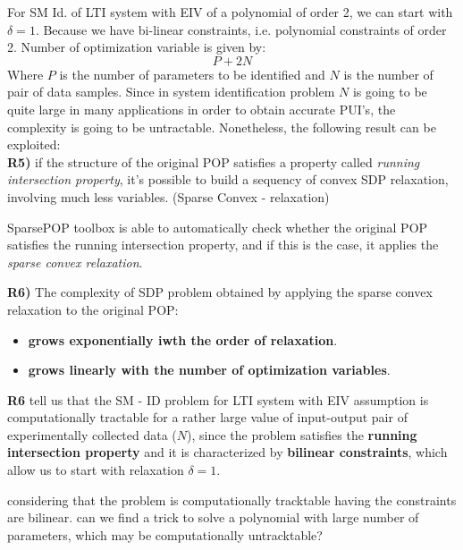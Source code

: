 For SM Id. of LTI system with EIV of a polynomial of order 2, we can start with $\delta =1$. Because we have bi-linear constraints, i.e. polynomial constraints of order 2. Number of optimization variable is given by:
\[
P + 2N
\]
Where $P$ is the number of parameters to be identified and $N$ is the number of pair of data samples. Since in system identification problem $N$ is going to be quite large in many applications in order to obtain accurate PUI's, the complexity is going to be untractable. Nonetheless, the following result can be exploited:\\
\textbf{R5)} if the structure of the original POP satisfies a property called \textit{running intersection property}, it's possible to build a sequency of convex SDP relaxation, involving much less variables. (Sparse Convex - relaxation)

\begin{factbox}
SparsePOP toolbox is able to automatically check whether the original POP satisfies the running intersection property, and if this is the case,
it applies the \textit{sparse convex relaxation}.
\end{factbox}

\textbf{R6)} The complexity of SDP problem obtained by applying the sparse convex relaxation to the original POP:
\begin{itemize}
\item\textbf{grows exponentially iwth the order of relaxation}.
\item \textbf{grows linearly with the number of optimization variables}.
\end{itemize}

\textbf{R6} tell us that the SM - ID problem for LTI system with EIV assumption is computationally tractable for a rather large value of input-output pair of experimentally collected data ($N$), since the problem satisfies the \textbf{running intersection property} and it is characterized by \textbf{bilinear constraints}, which allow us to start with relaxation $\delta =1$.

\begin{QandAbox}
considering that the problem is computationally tracktable having the constraints are bilinear. can we find a trick to solve a polynomial with large number of parameters, which may be computationally untracktable?
\end{QandAbox}

